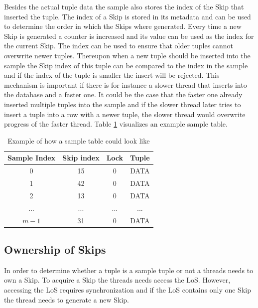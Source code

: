 \documentclass[sigconf,nonacm]{acmart}
\begin{document}
        Besides the actual tuple data the sample also stores the index of the Skip that inserted the tuple. The index of a Skip is stored in its metadata and can be used to determine the order in which the Skips where generated. Every time a new Skip is generated a counter is increased and its value can be used as the index for the current Skip.
        The index can be used to ensure that older tuples cannot overwrite newer tuples. Thereupon when a new tuple should be inserted into the sample the Skip index of this tuple can be compared to the index in the sample and if the index of the tuple is smaller the insert will be rejected. This mechanism is important if there is for instance a slower thread that inserts into the database and a faster one. It could be the case that the faster one already inserted multiple tuples into the sample and if the slower thread later tries to insert a tuple into a row with a newer tuple, the slower thread would overwrite progress of the faster thread. Table \ref{tab:sample} visualizes an example sample table.
        \begin{table}[h]
            \begin{tabular}{| c | c | c | c|} 
                \hline
                Sample Index & Skip index & Lock & Tuple \\
                \hline
                \hline
                0 & 15 & 0 & DATA \\
                \hline
                1 & 42 & 0 & DATA \\
                \hline
                2 & 13 & 0 & DATA \\
                \hline
                ... & ... & ... & ... \\
                \hline
                $m - 1$ & 31 & 0 & DATA \\
                \hline
            \end{tabular}
            \vspace{5mm}
            \caption{Example of how a sample table could look like}
            \label{tab:sample}
        \end{table}

    \subsection{Ownership of Skips}
        In order to determine whether a tuple is a sample tuple or not a threads needs to own a Skip. To acquire a Skip the threads needs access the LoS. However, accessing the LoS requires synchronization and if the LoS contains only one Skip the thread needs to generate a new Skip.
        
\end{document}
